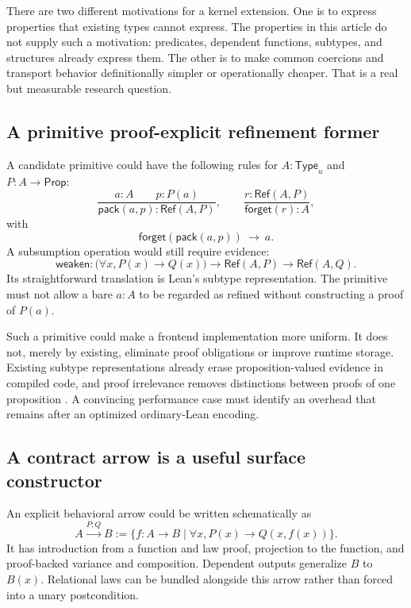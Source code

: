 \documentclass[11pt,a4paper]{article}
\newcommand{\Prop}{\mathsf{Prop}}
\newcommand{\Type}{\mathsf{Type}}
\newcommand{\CRef}{\mathsf{Ref}}
\theoremstyle{definition}
\theoremstyle{remark}
\begin{document}
There are two different motivations for a kernel extension. One is to express
properties that existing types cannot express. The properties in this article
do not supply such a motivation: predicates, dependent functions, subtypes, and
structures already express them. The other is to make common coercions and
transport behavior definitionally simpler or operationally cheaper. That is a
real but measurable research question.

\subsection{A primitive proof-explicit refinement former}

A candidate primitive could have the following rules for $A:\Type_u$ and
$P:A\to\Prop$:
\[
 \frac{a:A\qquad p:P(a)}{\mathsf{pack}(a,p):\CRef(A,P)},
 \qquad
 \frac{r:\CRef(A,P)}{\mathsf{forget}(r):A},
\]
with
\[
 \mathsf{forget}(\mathsf{pack}(a,p))\ \longrightarrow\ a.
\]
A subsumption operation would still require evidence:
\[
 \mathsf{weaken}:\bigl(\forall x,P(x)\to Q(x)\bigr)
                   \to\CRef(A,P)\to\CRef(A,Q).
\]
Its straightforward translation is Lean's subtype representation. The primitive
must not allow a bare $a:A$ to be regarded as refined without constructing a
proof of $P(a)$.

Such a primitive could make a frontend implementation more uniform. It does
not, merely by existing, eliminate proof obligations or improve runtime storage.
Existing subtype representations already erase proposition-valued evidence in
compiled code, and proof irrelevance removes distinctions between proofs of
one proposition \cite{lean-subtype,lean-propositions}. A convincing performance
case must identify an overhead that remains after an optimized ordinary-Lean
encoding.

\subsection{A contract arrow is a useful surface constructor}

An explicit behavioral arrow could be written schematically as
\[
 A\xrightarrow{P;Q}B
 :=\{f:A\to B\mid\forall x,P(x)\to Q(x,f(x))\}.
\]
It has introduction from a function and law proof, projection to the function,
and proof-backed variance and composition. Dependent outputs generalize $B$ to
$B(x)$. Relational laws can be bundled alongside this arrow rather than forced
into a unary postcondition.
\end{document}
